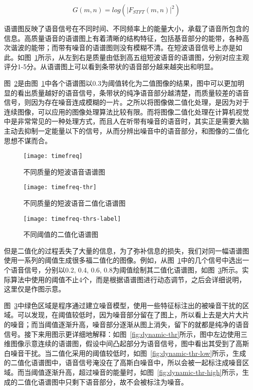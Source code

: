 \begin{equation}\label{eq:log_dstft}
G(m, n) = log(|F_{STFT}(m, n)|^2)
\end{equation}

语谱图反映了语音信号在不同时间、不同频率上的能量大小，承载了语音所包含的信息。高质量语音的语谱图上有着清晰的结构特征，包括基音部分的能带，各种高次谐波的能带；而带有噪音的语谱图则没有模糊不清。在短波语音信号上亦是如此。如图~\ref{fig:timefreq}所示，从左到右是质量由低到高五组短波语音的语谱图，分别对应主观评分1-5分。从语谱图上可以看到条带状的语音部分越来越突出和明显。

图~\ref{fig:timefreq-thr0.3}是由图~\ref{fig:timefreq}中各个语谱图以0.3为阈值转化为二值图像的结果，图中可以更加明显的看出质量越好的语音信号，条带状的纯净语音部分越清楚，而质量较差的语音信号，则因为存在噪音连成模糊的一片。之所以将图像做二值化处理，是因为对于连续图像，可以应用的图像处理算法比较有限。而将图像二值化处理在计算机视觉中是非常常见的一种处理方式，而且人在听带有噪音的语音时，其实正是需要大脑主动去抑制一定能量以下的信号，从而分辨出噪音中的语音部分，和图像的二值化思想不谋而合。

\begin{figure}
\centering
\texttt{[image: timefreq]}
\caption{不同质量的短波语音语谱图\label{fig:timefreq}}
\end{figure}

\begin{figure}
\centering
\texttt{[image: timefreq-thr]}
\caption{不同质量的短波语音二值化语谱图\label{fig:timefreq-thr0.3}}
\end{figure}

\begin{figure}
\centering
\texttt{[image: timefreq-thrs-label]}
\caption{不同阈值的二值化语谱图\label{fig:timefreq-thrs-label}}
\end{figure}

但是二值化的过程丢失了大量的信息，为了弥补信息的损失，我们对同一幅语谱图使用一系列的阈值生成很多福二值化的图像。例如，从图~\ref{fig:timefreq}中的几个信号中选出一个语音信号，分别以0.2, 0.4, 0.6, 0.8为阈值绘制其二值化语谱图，如图~\ref{fig:timefreq-thrs-label}所示。实际算法中使用的阈值不止4个，而是根据语谱图进行动态调节，之后会详细说明，这里仅是作图示意。

图~\ref{fig:timefreq-thrs-label}中绿色区域是程序通过建立噪音模型，使用一些特征标注出的被噪音干扰的区域。可以发现，在阈值较低时，因为噪音部分留在了图上，所以看上去是大片大片的噪音；而当阈值逐渐升高，噪音部分逐渐从图上消失，留下的就都是纯净的语音信号。接下来用图示更详细地解释：如图~\ref{fig:dynamic-thr}所示，图中左边使用三维图像示意连续的语谱图，假设中间凸起部分为语音信号，图中看出其受到了高斯白噪音干扰。当二值化采用的阈值较低时，如图~\ref{fig:dynamic-thr-low}所示，生成的二值化语谱图中，语音信号淹没在了高斯白噪音中，所以会被一起标注成噪音区域。而当阈值逐渐升高，超过噪音的能量时，如图~\ref{fig:dynamic-thr-high}所示，生成的二值化语谱图中只剩下语音部分，故不会被标注为噪音。

